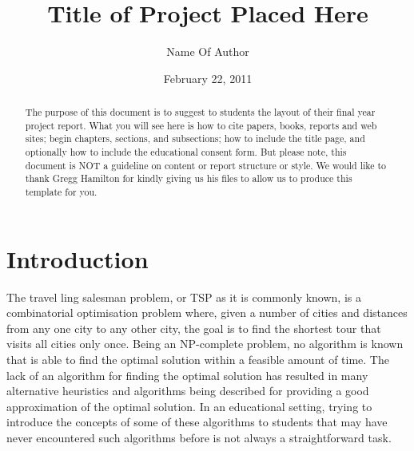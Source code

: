 \documentclass{l4proj}
\begin{document}
\title{Title of Project Placed Here}
\author{Name Of Author}
\date{February 22, 2011}
\maketitle

\begin{abstract}
The purpose of this document is to suggest to students the layout of their final year project report. What
you will see here is how to cite papers, books, reports and web sites; begin chapters, sections, and subsections; how
to include the title page, and optionally how to include the educational consent form. But please note,
this document is NOT a guideline on content or report structure or style. We would like to thank Gregg Hamilton for kindly giving us 
his files to allow us to produce this template for you.
\end{abstract}

\educationalconsent
%
%
\tableofcontents
\chapter{Introduction}
\label{intro}
The travel ling salesman problem, or TSP as it is commonly known, is a combinatorial optimisation problem where, given a number of cities and 
distances from any one city to any other city, the goal is to find the shortest tour that visits all cities only once. Being an NP-complete 
problem, no algorithm is known that is able to find the optimal solution within a feasible amount of time. The lack of an algorithm for finding 
the optimal solution has resulted in many alternative heuristics and algorithms being described for providing a good approximation of the optimal 
solution. In an educational setting, trying to introduce the concepts of some of these algorithms to students that may have never encountered 
such algorithms before is not always a straightforward task.
\end{document}
